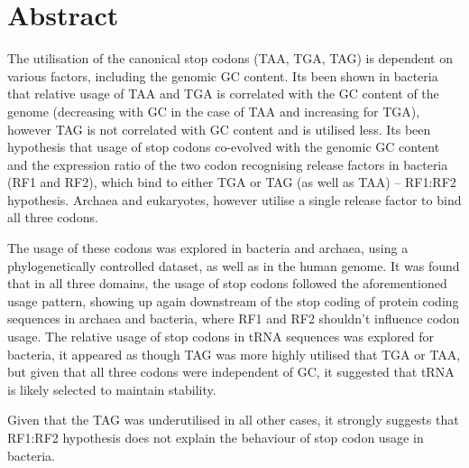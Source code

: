 \documentclass[../main.tex]{subfile}
\begin{document}
\pagebreak\section*{Abstract}
    The utilisation of the canonical stop codons (TAA, TGA, TAG) is dependent on various factors, including the genomic GC content. Its been shown in bacteria that relative usage of TAA and TGA is correlated with the GC content of the genome (decreasing with GC in the case of TAA and increasing for TGA), however TAG is not correlated with GC content and is utilised less. Its been hypothesis that usage of stop codons co-evolved with the genomic GC content and the expression ratio of the two codon recognising release factors in bacteria (RF1 and RF2), which bind to either TGA or TAG (as well as TAA) -- RF1:RF2 hypothesis. Archaea and eukaryotes, however utilise a single release factor to bind all three codons.

    The usage of these codons was explored in bacteria and archaea, using a phylogenetically controlled dataset, as well as in the human genome. It was found that in all three domains, the usage of stop codons followed the aforementioned usage pattern, showing up again downstream of the stop coding of protein coding sequences in archaea and bacteria, where RF1 and RF2 shouldn't influence codon usage. The relative usage of stop codons in tRNA sequences was explored for bacteria, it appeared as though TAG was more highly utilised that TGA or TAA, but given that all three codons were independent of GC, it suggested that tRNA is likely selected to maintain stability.

    Given that the TAG was underutilised in all other cases, it strongly suggests that RF1:RF2 hypothesis does not explain the behaviour of stop codon usage in bacteria.
\end{document}
